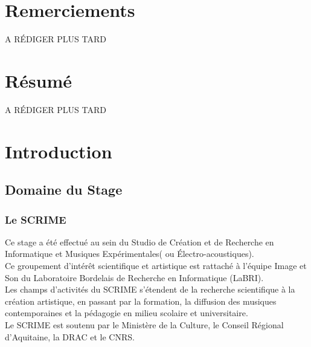 \documentclass[a4paper, 12pt]{report}
\begin{document}


\chapter*{Remerciements}


A RÉDIGER PLUS TARD


\chapter*{Résumé}


A RÉDIGER PLUS TARD



\tableofcontents %

\chapter{Introduction}
\section{Domaine du Stage}
\subsection{Le SCRIME \cite{scrime2015}}
Ce stage a été effectué au sein du Studio de Création et de Recherche en Informatique et Musiques Expérimentales( ou Électro-acoustiques).\\
Ce groupement d'intérêt scientifique et artistique est rattaché à l'équipe Image et Son du Laboratoire Bordelais de Recherche en Informatique (LaBRI).\\
Les champs d'activités du SCRIME s'étendent de la recherche scientifique à la création artistique, en passant par la formation, la diffusion des musiques contemporaines et la pédagogie en milieu scolaire et universitaire. \\
Le SCRIME est soutenu par le Ministère de la Culture, le Conseil Régional d'Aquitaine, la DRAC et le CNRS.\\
\end{document}
